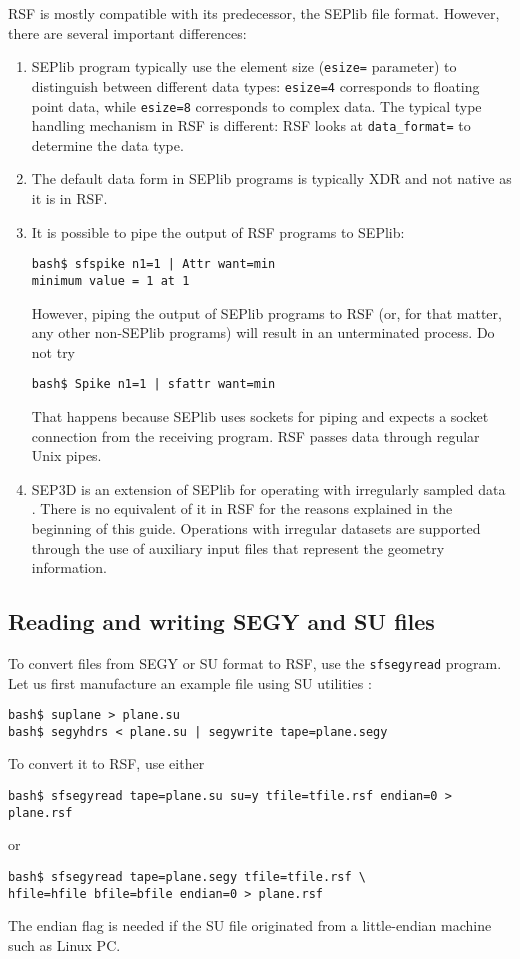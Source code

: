 RSF is mostly compatible with its predecessor, the SEPlib file format.
However, there are several important differences:
\begin{enumerate}
\item SEPlib program typically use the element size (\texttt{esize=}
parameter) to distinguish between different data types:
\texttt{esize=4} corresponds to floating point data, while
\texttt{esize=8} corresponds to complex data. The typical type
handling mechanism in RSF is different: RSF looks at
\texttt{data_format=} to determine the data type.
\item The default data form in SEPlib programs is
typically XDR and not native as it is in RSF. 
\item It is possible to pipe the
output of RSF programs to SEPlib:
\begin{verbatim}
bash$ sfspike n1=1 | Attr want=min
minimum value = 1 at 1
\end{verbatim}
However, piping the output of SEPlib programs to RSF (or, for that matter, any
other non-SEPlib programs) will result in an unterminated process. Do not try
\begin{verbatim}
bash$ Spike n1=1 | sfattr want=min
\end{verbatim}
That happens because SEPlib uses sockets for piping and expects a socket
connection from the receiving program. RSF passes data through regular Unix
pipes.
\item SEP3D is an extension of SEPlib for operating with irregularly sampled
  data \cite[]{Biondi.sep.92.343}. There is no equivalent of it in RSF for
  the reasons explained in the beginning of this guide. Operations with
  irregular datasets are supported through the use of auxiliary input files
  that represent the geometry information.
\end{enumerate}

\subsection{Reading and writing SEGY and SU files}

To convert files from SEGY or SU format to RSF, use the \texttt{sfsegyread}
program. Let us first manufacture an example file using SU utilities
\cite[]{su}:
\begin{verbatim}
bash$ suplane > plane.su
bash$ segyhdrs < plane.su | segywrite tape=plane.segy
\end{verbatim}
To convert it to RSF, use either
\begin{verbatim}
bash$ sfsegyread tape=plane.su su=y tfile=tfile.rsf endian=0 > plane.rsf
\end{verbatim}
or
\begin{verbatim}
bash$ sfsegyread tape=plane.segy tfile=tfile.rsf \
hfile=hfile bfile=bfile endian=0 > plane.rsf
\end{verbatim}
The endian flag is needed if the SU file originated from a little-endian
machine such as Linux PC.

